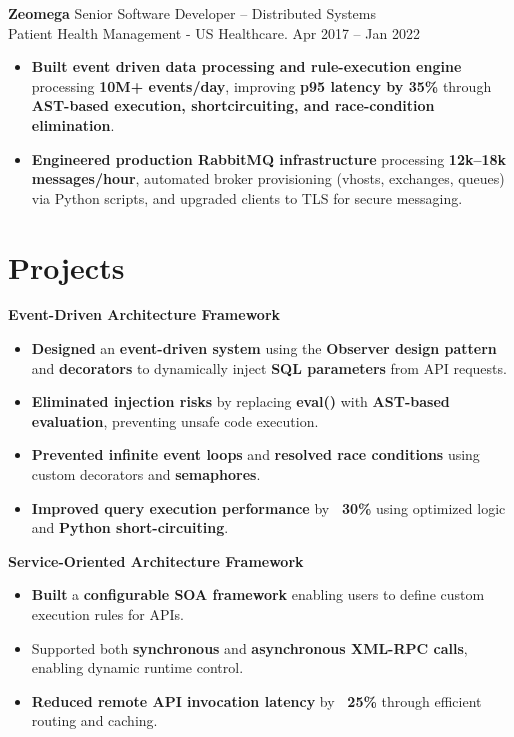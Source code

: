\documentclass[11 pt]{article}
\begin{document}
\vspace{6pt}

\noindent
{\normalsize\textbf{Zeomega}} \hfill \small{Senior Software Developer – Distributed Systems} \\
{Patient Health Management - US Healthcare. \hfill Apr 2017 -- Jan 2022}

\begin{itemize}
\item \textbf{Built event driven data processing and rule-execution engine} processing \textbf{10M+ events/day}, improving \textbf{p95 latency by 35\%} through \textbf{AST-based execution, shortcircuiting, and race-condition elimination}.

\item \textbf{Engineered production RabbitMQ infrastructure} processing \textbf{12k--18k messages/hour}, automated broker provisioning (vhosts, exchanges, queues) via Python scripts, and upgraded clients to TLS for secure messaging.

\end{itemize}




\section*{\textbf{Projects}}

\noindent\textbf{Event-Driven Architecture Framework}
\begin{itemize}
  \item \textbf{Designed} an \textbf{event-driven system} using the \textbf{Observer design pattern} and \textbf{decorators} to dynamically inject \textbf{SQL parameters} from API requests.
  \item \textbf{Eliminated injection risks} by replacing \textbf{eval()} with \textbf{AST-based evaluation}, preventing unsafe code execution.
  \item \textbf{Prevented infinite event loops} and \textbf{resolved race conditions} using custom decorators and \textbf{semaphores}.
  \item \textbf{Improved query execution performance} by \textbf{~30\%} using optimized logic and \textbf{Python short-circuiting}.
\end{itemize}
\vspace{6pt}

\noindent\textbf{Service-Oriented Architecture Framework}
\begin{itemize}
  \item \textbf{Built} a \textbf{configurable SOA framework} enabling users to define custom execution rules for APIs.
  \item Supported both \textbf{synchronous} and \textbf{asynchronous XML-RPC calls}, enabling dynamic runtime control.
  \item \textbf{Reduced remote API invocation latency} by \textbf{~25\%} through efficient routing and caching.
\end{itemize}
\vspace{6pt}
\end{document}
